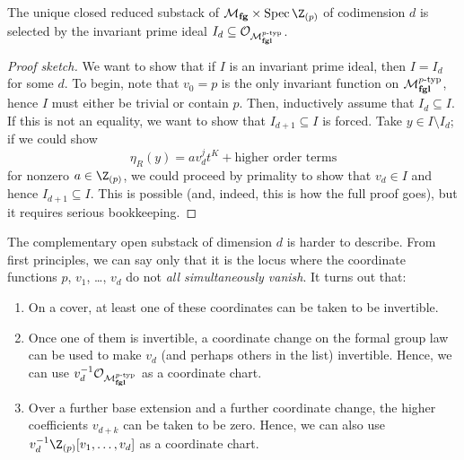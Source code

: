 \begin{theorem}\label{LandwebersClassificationOfClosedSubstacks}
The unique closed reduced substack of $\moduli{fg} \times \Spec \Z_{(p)}$ of codimension $d$ is selected by the invariant prime ideal $I_d \subseteq \mathcal{O}_{\mathcal{M}_{\mathbf{fgl}}^{p\text{-}\mathrm{typ}}}$.
\end{theorem}
\begin{proof}[Proof sketch]
We want to show that if $I$ is an invariant prime ideal, then $I = I_d$ for some $d$.  To begin, note that $v_0 = p$ is the only invariant function on $\mathcal{M}_{\mathbf{fgl}}^{p\text{-}\mathrm{typ}}$, hence $I$ must either be trivial or contain $p$.  Then, inductively assume that $I_d \subseteq I$.  If this is not an equality, we want to show that $I_{d+1} \subseteq I$ is forced.  Take $y \in I \setminus I_d$; if we could show \[\eta_R(y) = a v_d^j t^K + \text{higher order terms}\] for nonzero $a \in \Z_{(p)}$, we could proceed by primality to show that $v_d \in I$ and hence $I_{d+1} \subseteq I$.  This is possible (and, indeed, this is how the full proof goes), but it requires serious bookkeeping.
\end{proof}

\begin{remark}\label{OpenSubstacksOfMfg}
The complementary open substack of dimension $d$ is harder to describe.  From first principles, we can say only that it is the locus where the coordinate functions $p$, $v_1$, \ldots, $v_d$ do not \emph{all simultaneously vanish}.  It turns out that:
\begin{enumerate}
\item On a cover, at least one of these coordinates can be taken to be invertible.\item Once one of them is invertible, a coordinate change on the formal group law can be used to make $v_d$ (and perhaps others in the list) invertible.  Hence, we can use $v_d^{-1} \mathcal{O}_{\mathcal{M}_{\mathbf{fgl}}^{p\text{-}\mathrm{typ}}}$ as a coordinate chart.
\item Over a further base extension and a further coordinate change, the higher coefficients $v_{d+k}$ can be taken to be zero.  Hence, we can also use $v_d^{-1} \Z_{(p)}[v_1, \ldots, v_d]$ as a coordinate chart.
\end{enumerate}
\end{remark}

